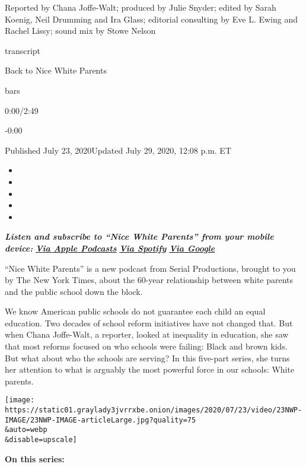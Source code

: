 Reported by Chana Joffe-Walt; produced by Julie Snyder; edited by Sarah
Koenig, Neil Drumming and Ira Glass; editorial consulting by Eve L.
Ewing and Rachel Lissy; sound mix by Stowe Nelson

transcript

Back to Nice White Parents

bars

0:00/2:49

-0:00

Published July 23, 2020Updated July 29, 2020, 12:08 p.m. ET

\begin{itemize}
\item
\item
\item
\item
\item
\end{itemize}

\emph{\textbf{Listen and subscribe to ``Nice White Parents'' from your
mobile device:}}
\textbf{\href{https://podcasts.apple.com/us/podcast/nice-white-parents/id1524080195}{\emph{Via
Apple Podcasts}}} \emph{\textbf{\textbar{}}}
\textbf{\href{https://open.spotify.com/show/7oBSLCZFCgpdCaBjIG8mLV?si=YcEPLD3xT2ejXmpQz-tRpw}{\emph{Via
Spotify}}} \emph{\textbf{\textbar{}}}
\textbf{\href{https://podcasts.google.com/feed/aHR0cHM6Ly9yc3MuYXJ0MTkuY29tL25pY2Utd2hpdGUtcGFyZW50cw}{\emph{Via
Google}}}

``Nice White Parents'' is a new podcast from Serial Productions, brought
to you by The New York Times, about the 60-year relationship between
white parents and the public school down the block.

We know American public schools do not guarantee each child an equal
education. Two decades of school reform initiatives have not changed
that. But when Chana Joffe-Walt, a reporter, looked at inequality in
education, she saw that most reforms focused on who schools were
failing: Black and brown kids. But what about who the schools are
serving? In this five-part series, she turns her attention to what is
arguably the most powerful force in our schools: White parents.

\texttt{[image: https://static01.graylady3jvrrxbe.onion/images/2020/07/23/video/23NWP-IMAGE/23NWP-IMAGE-articleLarge.jpg?quality=75\\\&auto=webp\\\&disable=upscale]}

\textbf{On this series:}

